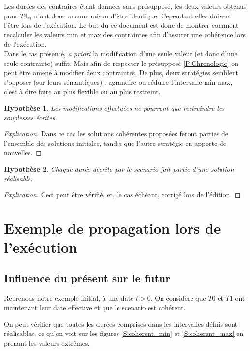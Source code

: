 \documentclass[10pt,a4paper]{article}
\newtheorem{presup}{Hypothèse}
\begin{document}
Les durées des contraires étant données sans présupposé, les deux valeurs obtenus pour $T4_m$ n'ont donc aucune raison d'être identique. Cependant elles doivent l'être lors de l'exécution. Le but du ce document est donc de montrer comment recalculer les valeurs min et max des contraintes afin d'assurer une cohérence lors de l'exécution.\\

Dans le cas présenté, \textit{a priori} la modification d'une seule valeur (et donc d'une seule contrainte) suffit. Mais afin de respecter le présupposé \ref{P:Chronologie} on peut être amené à modifier deux contraintes. De plus, deux stratégies semblent s'opposer (sur leurs sémantiques) : agrandire ou réduire l'intervalle min-max, c'est à dire faire au plus flexible ou au plus restreint.

	\begin{presup}
		Les modifications effectuées ne pourront que restreindre les souplesses écrites. \label{P:modif}
	\end{presup}
	\begin{proof}[Explication]
		Dans ce cas les solutions cohérentes proposées feront parties de l'ensemble des solutions initiales, tandis que l'autre stratégie en apporte de nouvelles.
	\end{proof}

	\begin{presup}
		Chaque durée décrite par le scenario fait partie d'une solution réalisable. \label{P:coherent}
	\end{presup}
	\begin{proof}[Explication]
		Ceci peut être vérifié, et, le cas échéant, corrigé lors de l'édition.
	\end{proof}

\section{Exemple de propagation lors de l'exécution}

	\subsection{Influence du présent sur le futur}
Reprenons notre exemple initial, à une date $t>0$. On considère que $T0$ et $T1$ ont maintenant leur date effective et que le scenario est cohérent.

On peut vérifier que toutes les durées comprises dans les intervalles défnis sont réalisables, ce qu'on voit sur les figures \ref{S:coherent_min} et \ref{S:coherent_max} en prenant les valeurs extrêmes.
\end{document}
